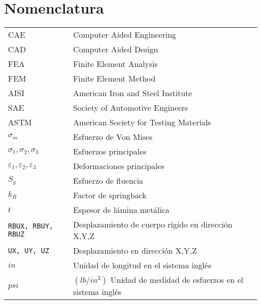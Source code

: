 \chapter*{Nomenclatura}




\begin{table}[h]
\def\arraystretch{1.15}
\begin{tabular}{p{4cm} p{12cm}}

CAE      &                       		      Computer Aided Engineering \\
CAD &                                  		  Computer Aided Design \\
FEA &                                  		  Finite Element Analysis \\
FEM & 							              Finite Element Method \\
AISI &                                        American Iron and Steel Institute \\
SAE &                                         Society of Automotive Engineers \\
ASTM &                                        American Society for Testing Materials \\
$\sigma_m$ &                                  Esfuerzo de Von Mises \\
$\sigma_1, \sigma_2, \sigma_3$ &              Esfuerzos principales \\
$\varepsilon_1, \varepsilon_2, \varepsilon_3$ & Deformaciones principales \\
$ S_y $ &                                     Esfuerzo de fluencia \\
$ k_R $ &                                     Factor de springback \\
$ t $ &                                       Espesor de lámina metálica \\
{\tt RBUX, RBUY, RBUZ} &                      Desplazamiento de cuerpo rígido en dirección X,Y,Z \\
{\tt UX, UY, UZ} &                            Desplazamiento en dirección X,Y,Z \\
$in$ &                                        Unidad de longitud en el sistema inglés \\
$psi$ &                                       $(lb/in^2)$ Unidad de medidad de esfuerzos en el sistema inglés \\



\end{tabular}
\end{table}
